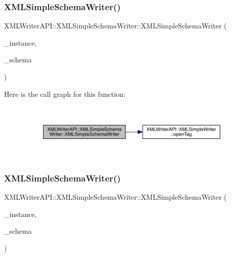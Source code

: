\subsubsection{\texorpdfstring{XMLSimpleSchemaWriter()}{XMLSimpleSchemaWriter()}\hspace{0.1cm}{\footnotesize\ttfamily [1/2]}}
{\footnotesize\ttfamily X\+M\+L\+Writer\+A\+P\+I\+::\+X\+M\+L\+Simple\+Schema\+Writer\+::\+X\+M\+L\+Simple\+Schema\+Writer (\begin{DoxyParamCaption}\item[{\mbox{\hyperlink{classXMLWriterAPI_1_1XMLSimpleWriter}{X\+M\+L\+Simple\+Writer}} \&}]{\+\_\+instance,  }\item[{\mbox{\hyperlink{classXMLWriterAPI_1_1XMLSimpleWriter}{X\+M\+L\+Simple\+Writer}} \&}]{\+\_\+schema }\end{DoxyParamCaption})\hspace{0.3cm}{\ttfamily [inline]}}

Here is the call graph for this function\+:
\nopagebreak
\begin{figure}[H]
\begin{center}
\leavevmode
\includegraphics[width=350pt]{db/d0b/classXMLWriterAPI_1_1XMLSimpleSchemaWriter_a309425b6927188991ba8fb9d19e0caca_cgraph}
\end{center}
\end{figure}
\mbox{\label{classXMLWriterAPI_1_1XMLSimpleSchemaWriter_a309425b6927188991ba8fb9d19e0caca}} 
\subsubsection{\texorpdfstring{XMLSimpleSchemaWriter()}{XMLSimpleSchemaWriter()}\hspace{0.1cm}{\footnotesize\ttfamily [2/2]}}
{\footnotesize\ttfamily X\+M\+L\+Writer\+A\+P\+I\+::\+X\+M\+L\+Simple\+Schema\+Writer\+::\+X\+M\+L\+Simple\+Schema\+Writer (\begin{DoxyParamCaption}\item[{\mbox{\hyperlink{classXMLWriterAPI_1_1XMLSimpleWriter}{X\+M\+L\+Simple\+Writer}} \&}]{\+\_\+instance,  }\item[{\mbox{\hyperlink{classXMLWriterAPI_1_1XMLSimpleWriter}{X\+M\+L\+Simple\+Writer}} \&}]{\+\_\+schema }\end{DoxyParamCaption})\hspace{0.3cm}{\ttfamily [inline]}}

